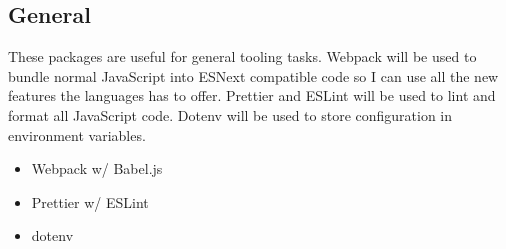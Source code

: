 \subsection{General}
These packages are useful for general tooling tasks.
Webpack will be used to bundle normal JavaScript into ESNext compatible code
so I can use all the new features the languages has to offer.
Prettier and ESLint will be used to lint and format all JavaScript code.
Dotenv will be used to store configuration in environment variables.

\begin{itemize}
  \item Webpack w/ Babel.js
  \item Prettier w/ ESLint
  \item dotenv
\end{itemize}

